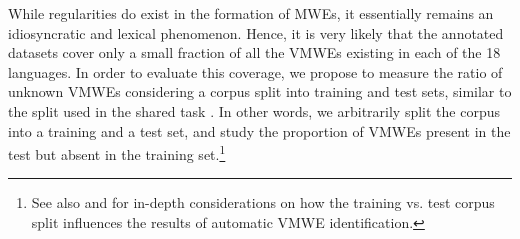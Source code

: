 \documentclass[output=paper,
modfonts,
]{langscibook}
\begin{document}

While regularities do exist in the formation of MWEs, it essentially remains an idiosyncratic and lexical phenomenon. Hence, it is very likely that the annotated datasets cover only a small fraction of all the VMWEs %
existing in each of the 18 languages. 
In order to evaluate this coverage, we propose to measure the ratio of unknown VMWEs considering a corpus split into training and test sets, similar to the split used in the shared task \citep{MWEWorkshop}. In other words, we arbitrarily split the corpus into a training and a test set, and study 
 the proportion of VMWEs present in the test but absent in the training set.\footnote{See also  and  for in-depth considerations on how the training vs. test corpus split influences the results of automatic VMWE identification.}
\end{document}
